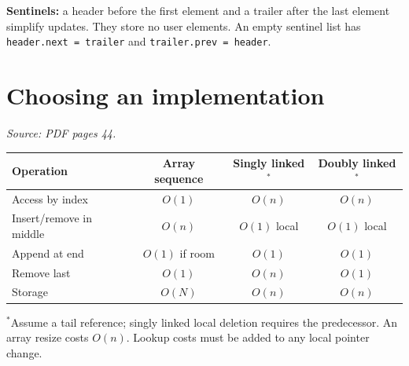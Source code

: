 \documentclass[11pt,letterpaper]{article}
\newcommand{\sourcepages}[1]{\textit{Source: PDF pages #1.}}
\newcommand{\method}[1]{\texttt{#1}}
\begin{document}
\textbf{Sentinels:} a header before the first element and a trailer after the last element simplify updates. They store no user elements. An empty sentinel list has \method{header.next = trailer} and \method{trailer.prev = header}.

\section{Choosing an implementation}
\sourcepages{44}
\begin{center}\small
\begin{tabular}{@{}lccc@{}}\toprule
Operation & Array sequence & Singly linked$^*$ & Doubly linked$^*$\\\midrule
Access by index & $O(1)$ & $O(n)$ & $O(n)$\\
Insert/remove in middle & $O(n)$ & $O(1)$ local & $O(1)$ local\\
Append at end & $O(1)$ if room & $O(1)$ & $O(1)$\\
Remove last & $O(1)$ & $O(n)$ & $O(1)$\\
Storage & $O(N)$ & $O(n)$ & $O(n)$\\\bottomrule
\end{tabular}\end{center}
$^*$Assume a tail reference; singly linked local deletion requires the predecessor. An array resize costs $O(n)$. Lookup costs must be added to any local pointer change.
\end{document}
